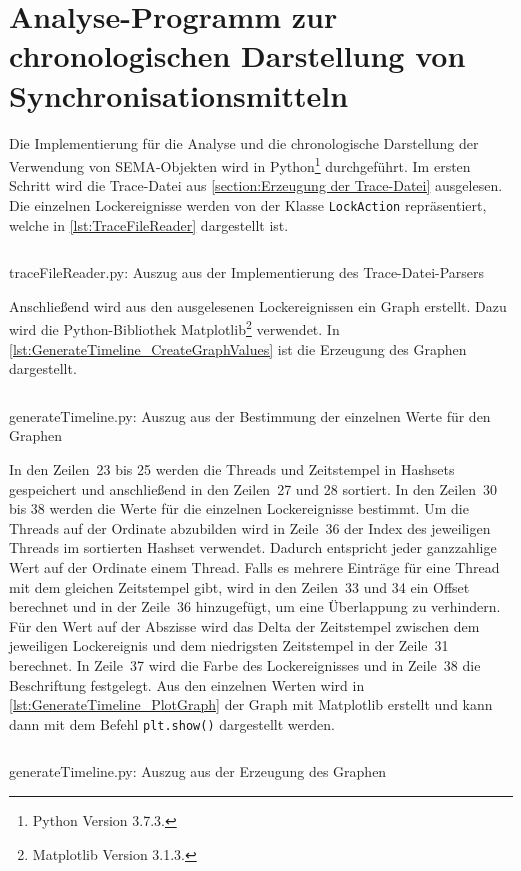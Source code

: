 \section{Analyse-Programm zur chronologischen Darstellung von Synchronisationsmitteln}
\label{section:Implementierung:Analyse-Programm}
Die Implementierung für die Analyse und die chronologische Darstellung der
Verwendung von \textrm{SEMA}-Objekten wird in Python\footnote{Python Version
3.7.3.} durchgeführt. Im ersten Schritt wird die Trace-Datei aus
\cref{section:Erzeugung der Trace-Datei} ausgelesen. Die einzelnen
Lockereignisse werden von der Klasse
\texttt{Lock\-Action} repräsentiert, welche in \cref{lst:TraceFileReader}
dargestellt ist.
\begin{listing}[ht]
  \inputminted[frame=lines,linenos,firstline=1,lastline=10]{python}{./Python/traceFileReader.py}
  \caption{traceFileReader.py: Auszug aus der Implementierung des Trace-Datei-Parsers}
  \label{lst:TraceFileReader}
\end{listing}

Anschließend wird aus den ausgelesenen Lockereignissen ein Graph erstellt. Dazu
wird die Python-Bibliothek Matplotlib\footnote{Matplotlib Version 3.1.3.}
verwendet. In \cref{lst:GenerateTimeline_CreateGraphValues} ist die Erzeugung
des Graphen dargestellt.
\begin{listing}[ht]
  \inputminted[frame=lines,linenos,firstline=16,lastline=38]{python}{./Python/generateTimeline.py}
  \caption{generateTimeline.py: Auszug aus der Bestimmung der einzelnen Werte für den Graphen}
  \label{lst:GenerateTimeline_CreateGraphValues}
\end{listing}
In den Zeilen~23 bis 25 werden die Threads und Zeitstempel in Hashsets
gespeichert und anschließend in den Zeilen~27 und 28 sortiert. In den Zeilen~30
bis 38 werden die Werte für die einzelnen Lockereignisse bestimmt. Um die
Threads auf der Ordinate abzubilden wird in Zeile~36 der Index des jeweiligen
Threads im sortierten Hashset verwendet. Dadurch entspricht jeder ganzzahlige
Wert auf der Ordinate einem Thread. Falls es mehrere Einträge für eine Thread
mit dem gleichen Zeitstempel gibt, wird in den Zeilen~33 und 34 ein Offset
berechnet und in der Zeile~36 hinzugefügt, um eine Überlappung zu verhindern.
Für den Wert auf der Abszisse wird das Delta der Zeitstempel zwischen dem
jeweiligen Lockereignis und dem niedrigsten Zeitstempel in der Zeile~31
berechnet. In Zeile~37 wird die Farbe des Lockereignisses und in Zeile~38 die
Beschriftung festgelegt. Aus den einzelnen Werten wird in
\cref{lst:GenerateTimeline_PlotGraph} der Graph mit Matplotlib erstellt und kann
dann mit dem Befehl \texttt{plt.show()} dargestellt werden.
\begin{listing}[ht]
  \inputminted[frame=lines,linenos,firstline=42,lastline=44]{python}{./Python/generateTimeline.py}
  \caption{generateTimeline.py: Auszug aus der Erzeugung des Graphen}
  \label{lst:GenerateTimeline_PlotGraph}
\end{listing}

